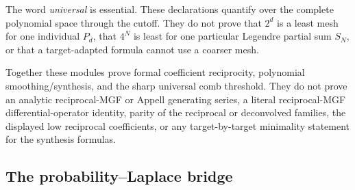 \documentclass[11pt,oneside]{article}
\theoremstyle{definition}
\theoremstyle{remark}
\begin{document}
The word \emph{universal} is essential.  These declarations quantify over the
complete polynomial space through the cutoff.  They do not prove that \(2^d\)
is a least mesh for one individual \(P_d\), that \(4^N\) is least for one
particular Legendre partial sum \(S_N\), or that a target-adapted formula
cannot use a coarser mesh.

Together these modules prove formal coefficient reciprocity, polynomial
smoothing/synthesis, and the sharp universal comb threshold.  They do not
prove an analytic reciprocal-MGF or Appell generating series, a literal
reciprocal-MGF differential-operator identity, parity of the reciprocal or
deconvolved families, the displayed low reciprocal coefficients, or any
target-by-target minimality statement for the synthesis formulas.

\subsection{The probability--Laplace bridge}
\label{sec:probability-laplace-bridge}
\end{document}
